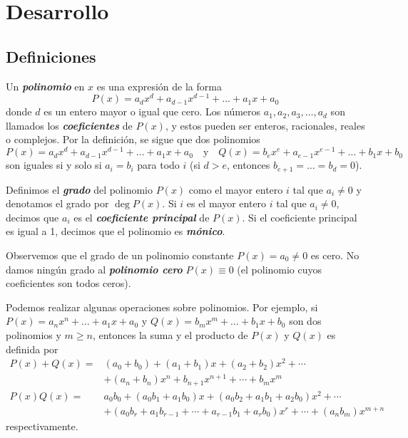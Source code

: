 \section{Desarrollo}

\subsection{Definiciones}

Un \textbf{\emph{polinomio}} en $x$ es una expresión de la forma
\[
    P(x) = a_d x^d + a_{d - 1} x^{d - 1} + \ldots + a_1 x + a_0
\]
donde $d$ es un entero mayor o igual que cero.
Los números $a_1, a_2, a_3, \dots, a_d$ son llamados los \textbf{\emph{coeficientes}} de $P(x)$, y estos pueden ser enteros, racionales, reales o complejos.
Por la definición, se sigue que dos polinomios
\[
    P(x) = a_d x^d + a_{d - 1} x^{d - 1} + \ldots + a_1 x + a_0 \quad \text{y} \quad Q(x) = b_e x^e + a_{e - 1} x^{e - 1} + \ldots + b_1 x + b_0
\]
son iguales si y solo si $a_i = b_i$ para todo $i$ (si $d > e$, entonces $b_{e + 1} = \ldots = b_d = 0$).

Definimos el \textbf{\emph{grado}} del polinomio $P(x)$ como el mayor entero $i$ tal que $a_i \neq 0$ y denotamos el grado por $\deg P(x)$.
Si $i$ es el mayor entero $i$ tal que $a_i \neq 0$, decimos que $a_i$ es el \textbf{\emph{coeficiente principal}} de $P(x)$.
Si el coeficiente principal es igual a 1, decimos que el polinomio es \textbf{\emph{mónico}}.

Observemos que el grado de un polinomio constante $P(x) = a_0 \neq 0$ es cero.
No damos ningún grado al \textbf{\emph{polinomio cero}} $P(x) \equiv 0$ (\ie el polinomio cuyos coeficientes son todos ceros).

Podemos realizar algunas operaciones sobre polinomios.
Por ejemplo, si $P(x) = a_n x^n + \ldots + a_1 x + a_0$ y $Q(x) = b_m x^m + \ldots + b_1 x + b_0$ son dos polinomios y $m \geq n$, entonces la suma y el producto de $P(x)$ y $Q(x)$ es definida por
\begin{align*}
    P(x) + Q(x) =& (a_0  + b_0) + (a_1 + b_1)x + (a_2 + b_2)x^2 + \cdots\\
    &+ (a_n + b_n)x^n + b_{n + 1} x^{n + 1} + \cdots + b_m x^m\\[2mm]
    P(x)Q(x) =& a_0 b_0 + (a_0 b_1 + a_1 b_0)x + (a_0 b_2 + a_1 b_1 + a_2 b_0)x^2 + \cdots \\
    &+ (a_0 b_r + a_1 b_{r - 1} + \cdots + a_{r - 1}b_1 + a_r b_0)x^r + \cdots + (a_n b_m)x^{m + n}
\end{align*}
respectivamente.


